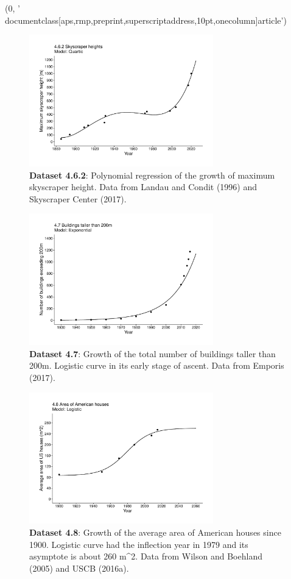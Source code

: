 (0, '\\documentclass[aps,rmp,preprint,superscriptaddress,10pt,onecolumn]{article}\n')
\begin{document}
\begin{figure}[h]
\includegraphics[width=8cm]{output/figs-ggplot/4.6.2.pdf}
\caption{\textbf{Dataset 4.6.2}: Polynomial regression of the growth of maximum skyscraper height. Data from Landau and Condit (1996) and Skyscraper Center (2017). }
\end{figure}
	
\begin{figure}[h]
\includegraphics[width=8cm]{output/figs-ggplot/4.7.pdf}
\caption{\textbf{Dataset 4.7}: Growth of the total number of buildings taller than 200m. Logistic curve in its early stage of ascent. Data from Emporis (2017).}
\end{figure}
	
\begin{figure}[h]
\includegraphics[width=8cm]{output/figs-ggplot/4.8.pdf}
\caption{\textbf{Dataset 4.8}: Growth of the average area of American houses since 1900. Logistic curve had the inflection year in 1979 and its asymptote is about 260 m^2. Data from Wilson and Boehland (2005) and USCB (2016a).}
\end{figure}
	
\end{document}
